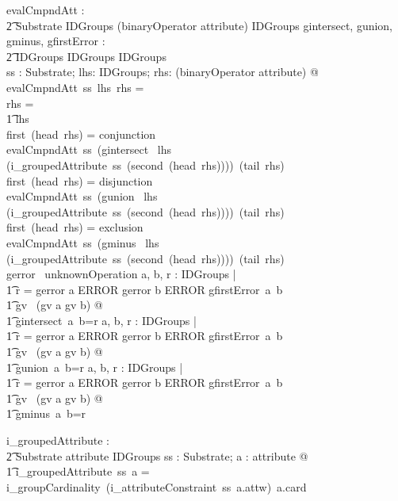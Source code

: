 \documentclass{article}
\begin{document}
\begin{gendef}
   evalCmpndAtt : \\
\t2 Substrate \fun IDGroups \fun \seq (binaryOperator \cross attribute) \fun IDGroups
\also
   gintersect, gunion, gminus, gfirstError : \\
\t2 IDGroups \fun IDGroups \fun IDGroups \\
\where
   \forall ss : Substrate; lhs: IDGroups; rhs: \seq (binaryOperator \cross attribute) @ \\
  evalCmpndAtt~ss~lhs~rhs = \\
 \IF rhs = \langle \rangle \\
\t1 \THEN lhs \\
\ELSE \IF first~(head~rhs) = conjunction \\
\THEN  evalCmpndAtt~ss~(gintersect~ lhs (i\_groupedAttribute~ss~(second~(head~rhs))))~(tail~rhs) \\
 \ELSE \IF first~(head~rhs)  = disjunction \\
\THEN  evalCmpndAtt~ss~(gunion~ lhs (i\_groupedAttribute~ss~(second~(head~rhs))))~(tail~rhs) \\
 \ELSE \IF first~(head~rhs)  = exclusion \\
\THEN  evalCmpndAtt~ss~(gminus~ lhs (i\_groupedAttribute~ss~(second~(head~rhs))))~(tail~rhs) \\
 \ELSE gerror~ unknownOperation
\also
   \forall a, b, r : IDGroups | \\
\t1 r = \IF gerror \inv a \in ERROR \lor gerror \inv b \in ERROR \THEN gfirstError~a~b \\
\t1 \ELSE gv ~(gv \inv a \cap gv \inv b) @ \\
\t1 gintersect~a~b=r
\also
   \forall a, b, r : IDGroups | \\
\t1 r = \IF gerror \inv a \in ERROR \lor gerror \inv b \in ERROR \THEN gfirstError~a~b \\
\t1 \ELSE gv ~(gv \inv a \cup gv \inv b) @ \\
\t1 gunion~a~b=r
\also
   \forall a, b, r : IDGroups | \\
\t1 r = \IF gerror \inv a \in ERROR \lor gerror \inv b \in ERROR \THEN gfirstError~a~b \\
\t1 \ELSE gv ~(gv \inv a \setminus gv \inv b) @ \\
\t1 gminus~a~b=r
\end{gendef}
\begin{gendef}
   i\_groupedAttribute : \\
\t2 Substrate \fun attribute \fun IDGroups
\where
\forall ss : Substrate; a : attribute @ \\
\t1 i\_groupedAttribute~ss~a =  i\_groupCardinality~(i\_attributeConstraint~ss~a.attw)~a.card \\
\end{gendef}
\end{document}
